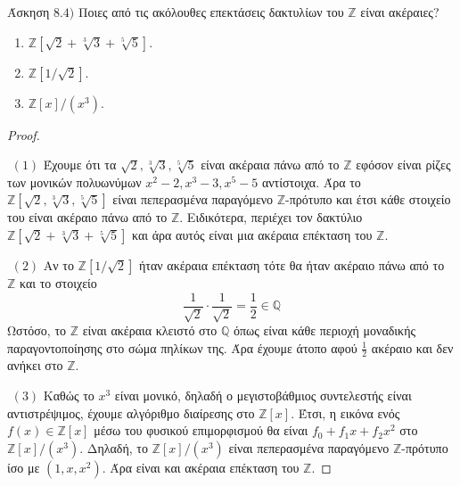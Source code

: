 \documentclass[oneside,a4paper]{article}
\newcommand{\Z}{\mathbb{Z}}
\newcommand{\Q}{\mathbb{Q}}
\begin{document}
\noindent Άσκηση $8.4)$ Ποιες από τις ακόλουθες επεκτάσεις δακτυλίων του $\Z$ είναι ακέραιες?
\begin{enumerate}
	\item $\Z[\sqrt{2} + \sqrt[3]{3} + \sqrt[5]{5}]$.
	\item $\Z[1/\sqrt{2}]$.
	\item $\Z[x]/(x^3)$.
\end{enumerate}
\vspace*{0.1cm}
\begin{proof} $ $

	$ $\newline
	$(1)$ Έχουμε ότι τα $\sqrt{2},\sqrt[3]{3},\sqrt[5]{5}$ είναι ακέραια πάνω από το $\Z$ εφόσον είναι ρίζες των μονικών πολυωνύμων $x^2 - 2, x^3 -3, x^5 -5$ αντίστοιχα. Άρα το $\Z[\sqrt{2},\sqrt[3]{3},\sqrt[5]{5}]$ είναι πεπερασμένα παραγόμενο $\Z$-πρότυπο και έτσι κάθε στοιχείο του είναι ακέραιο πάνω από το $\Z$. Ειδικότερα, περιέχει τον δακτύλιο $\Z[\sqrt{2} + \sqrt[3]{3} +\sqrt[5]{5}]$ και άρα αυτός είναι μια ακέραια επέκταση του $\Z$.

	\vspace*{0.5cm}
	$ $\newline
	$(2)$ Αν το $\Z[1/\sqrt{2}]$ ήταν ακέραια επέκταση τότε θα ήταν ακέραιο πάνω από το $\Z$ και το στοιχείο $$\frac1{\sqrt{2}}\cdot \frac1{\sqrt{2}} = \frac12 \in \Q$$ Ωστόσο, το $\Z$ είναι ακέραια κλειστό στο $\Q$ όπως είναι κάθε περιοχή μοναδικής παραγοντοποίησης στο σώμα πηλίκων της. Άρα έχουμε άτοπο αφού $\frac{1}{2}$ ακέραιο και δεν ανήκει στο $\Z$.

	\vspace*{0.5cm}
	$ $\newline
	$(3)$ Καθώς το $x^3$ είναι μονικό, δηλαδή ο μεγιστοβάθμιος συντελεστής είναι αντιστρέψιμος, έχουμε αλγόριθμο διαίρεσης στο $\Z[x]$. Έτσι, η εικόνα ενός $f(x) \in \Z[x]$ μέσω του φυσικού επιμορφισμού θα είναι $f_0 + f_1 x + f_2 x^2$ στο $\Z[x]/(x^3)$. Δηλαδή, το $\Z[x]/(x^3)$ είναι πεπερασμένα παραγόμενο $\Z$-πρότυπο ίσο με $(1,x,x^2)$. Άρα είναι και ακέραια επέκταση του $\Z$.
\end{proof}
\end{document}
